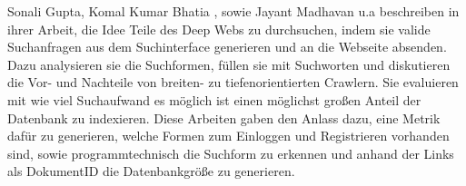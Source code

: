 Sonali Gupta, Komal Kumar Bhatia \cite{gupta2014comparative}, sowie Jayant Madhavan u.a \cite{madhavan2008google} beschreiben in ihrer Arbeit, die Idee Teile des Deep Webs zu durchsuchen, indem sie valide Suchanfragen aus dem Suchinterface generieren und an die Webseite absenden. Dazu analysieren sie die Suchformen, füllen sie mit Suchworten und diskutieren die Vor- und Nachteile von breiten- zu tiefenorientierten Crawlern. Sie evaluieren mit wie viel Suchaufwand es möglich ist einen möglichst großen Anteil der Datenbank zu indexieren. Diese Arbeiten gaben den Anlass dazu, eine Metrik dafür zu generieren, welche Formen zum Einloggen und Registrieren vorhanden sind, sowie programmtechnisch die Suchform zu erkennen und anhand der Links als DokumentID die Datenbankgröße zu generieren.

